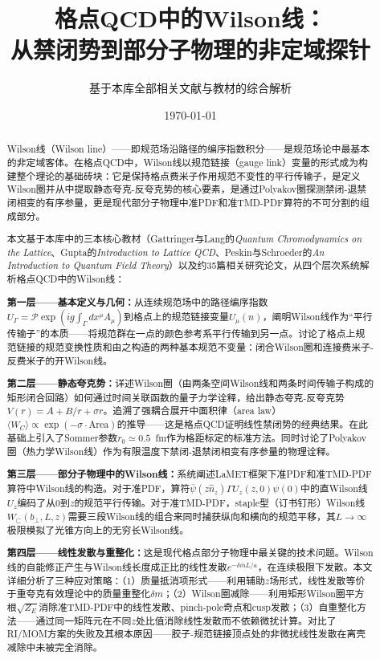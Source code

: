 \documentclass[12pt,a4paper]{ctexart}
\title{\heiti 格点QCD中的Wilson线：\\
从禁闭势到部分子物理的非定域探针}
\author{基于本库全部相关文献与教材的综合解析}
\date{\today}
\theoremstyle{definition}
\begin{document}
\maketitle

\begin{abstract}
\noindent
Wilson线（Wilson line）——即规范场沿路径的编序指数积分——是规范场论中最基本的非定域客体。在格点QCD中，Wilson线以规范链接（gauge link）变量的形式成为构建整个理论的基础砖块：它是保持格点费米子作用规范不变性的平行传输子，是定义Wilson圈并从中提取静态夸克-反夸克势的核心要素，是通过Polyakov圈探测禁闭-退禁闭相变的有序参量，更是现代部分子物理中准PDF和准TMD-PDF算符的不可分割的组成部分。

本文基于本库中的三本核心教材（Gattringer与Lang的\textit{Quantum Chromodynamics on the Lattice}、Gupta的\textit{Introduction to Lattice QCD}、Peskin与Schroeder的\textit{An Introduction to Quantum Field Theory}）以及约35篇相关研究论文，从四个层次系统解析格点QCD中的Wilson线：

\textbf{第一层——基本定义与几何：}从连续规范场中的路径编序指数$U_\Gamma = \mathcal{P}\exp(ig\int_\Gamma dx^\mu A_\mu)$到格点上的规范链接变量$U_\mu(n)$，阐明Wilson线作为``平行传输子''的本质——将规范群在一点的颜色参考系平行传输到另一点。讨论了格点上规范链接的规范变换性质和由之构造的两种基本规范不变量：闭合Wilson圈和连接费米子-反费米子的开Wilson线。

\textbf{第二层——静态夸克势：}详述Wilson圈（由两条空间Wilson线和两条时间传输子构成的矩形闭合回路）如何通过时间关联函数的量子力学诠释，给出静态夸克-反夸克势$V(r) = A + B/r + \sigma r$。追溯了强耦合展开中面积律（area law）$\langle W_C\rangle \propto \exp(-\sigma \cdot \text{Area})$的推导——这是格点QCD证明线性禁闭势的经典结果。在此基础上引入了Sommer参数$r_0\simeq 0.5$~fm作为格距标定的标准方法。同时讨论了Polyakov圈（热力学Wilson线）作为有限温度下禁闭-退禁闭相变有序参量的物理诠释。

\textbf{第三层——部分子物理中的Wilson线：}系统阐述LaMET框架下准PDF和准TMD-PDF算符中Wilson线的构造。对于准PDF，算符$\bar\psi(z\hat n_z)\Gamma U_z(z,0)\psi(0)$中的直Wilson线$U_z$编码了从$0$到$z$的规范平行传输。对于准TMD-PDF，staple型（订书钉形）Wilson线$W_{\sqsubset}(b_\perp, L, z)$需要三段Wilson线的组合来同时捕获纵向和横向的规范平移，其$L\to\infty$极限模拟了光锥方向上的无穷长Wilson线。

\textbf{第四层——线性发散与重整化：}这是现代格点部分子物理中最关键的技术问题。Wilson线的自能修正产生与Wilson线长度成正比的线性发散$e^{-\delta\bar{m}L/a}$，在连续极限下发散。本文详细分析了三种应对策略：（1）质量抵消项形式——利用辅助$z$场形式，线性发散等价于重夸克有效理论中的质量重整化$\delta m$；（2）Wilson圈减除——利用矩形Wilson圈平方根$\sqrt{Z_E}$消除准TMD-PDF中的线性发散、pinch-pole奇点和cusp发散；（3）自重整化方法——通过同一矩阵元在不同$z$处比值消除线性发散而不依赖微扰计算。对比了RI/MOM方案的失败及其根本原因——胶子-规范链接顶点处的非微扰线性发散在离壳减除中未被完全消除。


\end{abstract}
\end{document}
